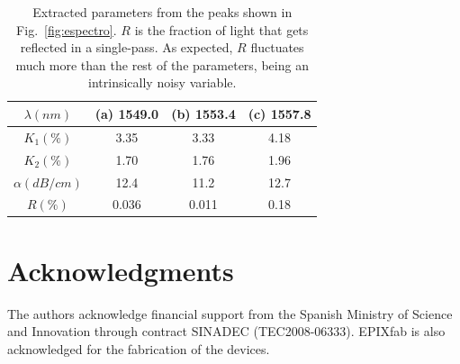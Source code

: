 \documentclass[10pt,letterpaper]{article}
\begin{document}
\begin{table}[!t]
\renewcommand{\arraystretch}{1.3}
\label{results_table}
\centering
    \begin{tabular}{|c|c|c|c|}
        \hline
        $\lambda(nm)$&(a) 1549.0&(b) 1553.4&(c) 1557.8 \\
        \hline
        \hline
        $K_1(\%)$ & 3.35 & 3.33 & 4.18\\
        \hline
        $K_2(\%)$ & 1.70 & 1.76 & 1.96\\
        \hline
        $\alpha (dB/cm)$ & 12.4 & 11.2 & 12.7\\
        \hline
        $R(\%)$ & 0.036 & 0.011 & 0.18\\
        \hline
    \end{tabular}
\caption{Extracted parameters from the peaks shown in Fig.~\ref{fig:espectro}. $R$ is the fraction of light that gets reflected in a single-pass. As expected, $R$ fluctuates much more than the rest of the parameters, being an intrinsically noisy variable.}
\label{table:results}
\end{table}


\section*{Acknowledgments}


The authors acknowledge financial support from the Spanish Ministry of Science and Innovation through contract SINADEC (TEC2008-06333). EPIXfab is also acknowledged for the fabrication of the devices.
\end{document}
